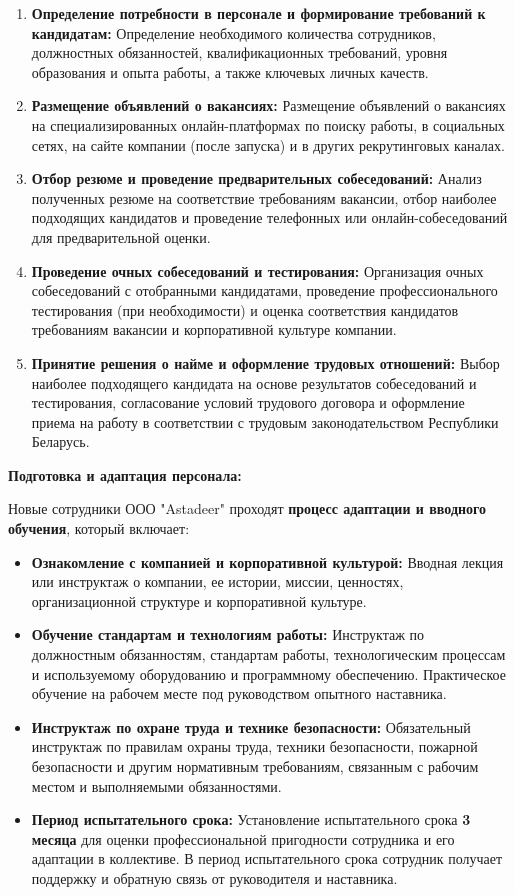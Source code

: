 \begin{enumerate}
    \item \textbf{Определение потребности в персонале и формирование требований к кандидатам:}  Определение необходимого количества сотрудников, должностных обязанностей, квалификационных требований, уровня образования и опыта работы, а также ключевых личных качеств.
    \item \textbf{Размещение объявлений о вакансиях:}  Размещение объявлений о вакансиях на специализированных онлайн-платформах по поиску работы, в социальных сетях, на сайте компании (после запуска) и в других рекрутинговых каналах.
    \item \textbf{Отбор резюме и проведение предварительных собеседований:}  Анализ полученных резюме на соответствие требованиям вакансии, отбор наиболее подходящих кандидатов и проведение телефонных или онлайн-собеседований для предварительной оценки.
    \item \textbf{Проведение очных собеседований и тестирования:}  Организация очных собеседований с отобранными кандидатами, проведение профессионального тестирования (при необходимости) и оценка соответствия кандидатов требованиям вакансии и корпоративной культуре компании.
    \item \textbf{Принятие решения о найме и оформление трудовых отношений:}  Выбор наиболее подходящего кандидата на основе результатов собеседований и тестирования, согласование условий трудового договора и оформление приема на работу в соответствии с трудовым законодательством Республики Беларусь.
\end{enumerate}

\textbf{Подготовка и адаптация персонала:}

Новые сотрудники ООО "Astadeer" проходят \textbf{процесс адаптации и вводного обучения}, который включает:

\begin{itemize}
    \item \textbf{Ознакомление с компанией и корпоративной культурой:}  Вводная лекция или инструктаж о компании, ее истории, миссии, ценностях, организационной структуре и корпоративной культуре.
    \item \textbf{Обучение стандартам и технологиям работы:}  Инструктаж по должностным обязанностям, стандартам работы, технологическим процессам и используемому оборудованию и программному обеспечению.  Практическое обучение на рабочем месте под руководством опытного наставника.
    \item \textbf{Инструктаж по охране труда и технике безопасности:}  Обязательный инструктаж по правилам охраны труда, техники безопасности, пожарной безопасности и другим нормативным требованиям, связанным с рабочим местом и выполняемыми обязанностями.
    \item \textbf{Период испытательного срока:}  Установление испытательного срока \textbf{3 месяца} для оценки профессиональной пригодности сотрудника и его адаптации в коллективе.  В период испытательного срока сотрудник получает поддержку и обратную связь от руководителя и наставника.
\end{itemize}

